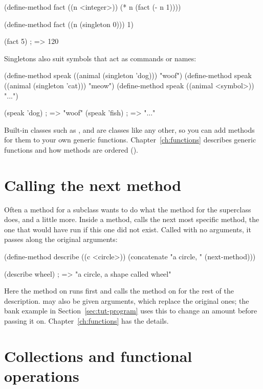 \begin{dylan}
(define-method fact ((n <integer>))
  (* n (fact (- n 1))))

(define-method fact ((n (singleton 0)))
  1)

(fact 5)                        ; => 120
\end{dylan}

Singletons also suit symbols that act as commands or names:

\begin{dylan}
(define-method speak ((animal (singleton 'dog))) "woof")
(define-method speak ((animal (singleton 'cat))) "meow")
(define-method speak ((animal <symbol>)) "...")

(speak 'dog)                    ; => "woof"
(speak 'fish)                   ; => "..."
\end{dylan}

Built-in classes such as ,  and
 are classes like any other, so you can add methods for them
to your own generic functions. Chapter~\ref{ch:functions} describes
generic functions and how methods are ordered ().

\section{Calling the next method}\label{sec:tut-next-method}

Often a method for a subclass wants to do what the method for the
superclass does, and a little more. Inside a method, 
calls the next most specific method, the one that would have run if this
one did not exist. Called with no arguments, it passes along the original
arguments:

\begin{dylan}
(define-method describe ((c <circle>))
  (concatenate "a circle, " (next-method)))

(describe wheel)                ; => "a circle, a shape called wheel"
\end{dylan}

Here the method on  runs first and calls the method on
 for the rest of the description.  may
also be given arguments, which replace the original ones; the bank
example in Section~\ref{sec:tut-program} uses this to change an amount
before passing it on. Chapter~\ref{ch:functions} has the details.

\section{Collections and functional operations}\label{sec:tut-functional}

